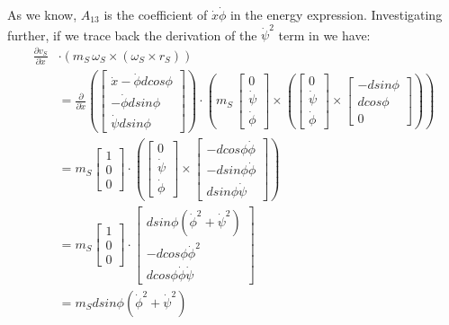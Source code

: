 \documentclass[a4paper,10pt]{article}
\begin{document}
\begin{itemize}
As we know, $A_{13}$ is the coefficient of $\dot{x}\dot\phi$ in the energy expression.
Investigating further, if we trace back the derivation of the $\dot\psi^2$ term in \cite{kim2005dynamic} we have:
\small{
\begin{align}
 \frac{\partial v_S}{\partial \dot{x}}& \cdot (m_S\,\omega_S \times (\omega_S \times r_S)) \nonumber \\
   &= \frac{\partial}{\partial \dot{x}}\left(\left[\begin{matrix} \dot{x}-\dot{\phi}dcos\phi \\ -\dot{\phi}dsin\phi \\ \dot{\psi}dsin\phi\end{matrix}\right]\right)
       \cdot \left(m_S\,\left[\begin{matrix} 0 \\ \dot\psi \\ \dot\phi \end{matrix} \right] \times \left(\left[\begin{matrix} 0 \\ \dot\psi \\ \dot\phi \end{matrix} \right] 
       \times \left[\begin{matrix} -dsin\phi \\ dcos\phi \\ 0 \end{matrix} \right]\right)\right) \nonumber \\
   &= m_S\left[\begin{matrix} 1 \\ 0 \\ 0\end{matrix}\right] \cdot \left(\left[\begin{matrix} 0 \\ \dot\psi \\ \dot\phi \end{matrix} \right] \times 
       \left[\begin{matrix}  -dcos\phi\dot{\phi} \\ -dsin\phi\dot{\phi} \\ dsin\phi\dot{\psi} \end{matrix} \right]\right)  \nonumber \\
   &= m_S\left[\begin{matrix} 1 \\ 0 \\ 0\end{matrix}\right] \cdot \left[\begin{matrix} dsin\phi(\dot\phi^2+\dot\psi^2) \\ -dcos\phi\dot\phi^2 \\ dcos\phi\dot\phi\dot\psi \end{matrix} \right] \nonumber \\
   &= m_Sdsin\phi(\dot\phi^2+\dot\psi^2)
\end{align}}




\end{itemize}
\end{document}
